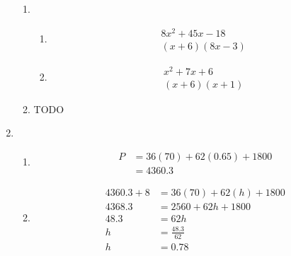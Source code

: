 \documentclass[11pt]{article}
\begin{document}
\begin{enumerate}
\begin{enumerate}
            \item
                \begin{enumerate}
                    \item
                        \begin{equation*}
                            \begin{split}
                                8x^2+45x-18\\
                                (x+6)(8x-3)
                            \end{split}
                        \end{equation*}
                    \item
                        \begin{equation*}
                            \begin{split}
                                x^2+7x+6\\
                                (x+6)(x+1)
                            \end{split}
                        \end{equation*}
                \end{enumerate}

            \item
                TODO   
        \end{enumerate}

    \pagebreak
    \item
        \begin{enumerate}
            \item
                \begin{equation*}
                    \begin{split}
                        P&=36(70)+62(0.65)+1800\\
                        &=4360.3
                    \end{split}
                \end{equation*}

            \item
                \begin{equation*}
                    \begin{split}
                        4360.3+8&=36(70)+62(h)+1800\\
                        4368.3&=2560+62h+1800\\
                        48.3&=62h\\
                        h&=\frac{48.3}{62}\\
                        h&=0.78
                    \end{split}
                \end{equation*}


\end{enumerate}
\end{enumerate}
\end{document}

